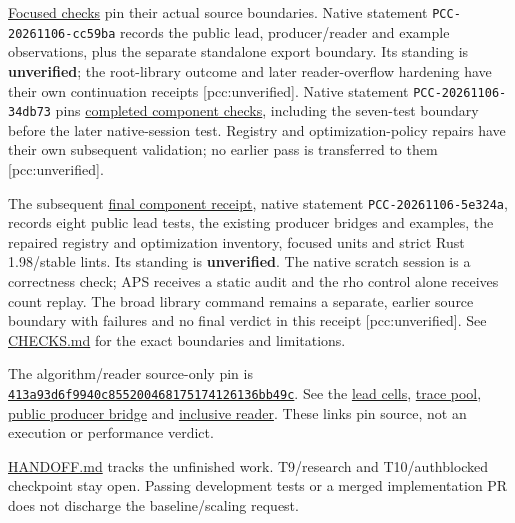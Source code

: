 \documentclass[
  10pt,
]{article}
\begin{document}
\href{validation/focused-checks.json}{Focused checks} pin their actual
source boundaries. Native statement \texttt{PCC-20261106-cc59ba} records
the public lead, producer/reader and example observations, plus the
separate standalone export boundary. Its standing is
\textbf{unverified}; the root-library outcome and later reader-overflow
hardening have their own continuation receipts {[}pcc:unverified{]}.
Native statement \texttt{PCC-20261106-34db73} pins
\href{validation/completed-components.json}{completed component checks},
including the seven-test boundary before the later native-session test.
Registry and optimization-policy repairs have their own subsequent
validation; no earlier pass is transferred to them {[}pcc:unverified{]}.

The subsequent \href{validation/final-components.json}{final component
receipt}, native statement \texttt{PCC-20261106-5e324a}, records eight
public lead tests, the existing producer bridges and examples, the
repaired registry and optimization inventory, focused units and strict
Rust 1.98/stable lints. Its standing is \textbf{unverified}. The native
scratch session is a correctness check; APS receives a static audit and
the rho control alone receives count replay. The broad library command
remains a separate, earlier source boundary with failures and no final
verdict in this receipt {[}pcc:unverified{]}. See \url{CHECKS.md} for
the exact boundaries and limitations.

The algorithm/reader source-only pin is
\href{https://github.com/isogeny-labs/crypto/commit/413a93d6f9940c855200468175174126136bb49c}{\texttt{413a93d6f9940c855200468175174126136bb49c}}.
See the
\href{https://github.com/isogeny-labs/crypto/blob/413a93d6f9940c855200468175174126136bb49c/src/cryptanalysis/aps_single_relation/leads.rs}{lead
cells},
\href{https://github.com/isogeny-labs/crypto/blob/413a93d6f9940c855200468175174126136bb49c/src/cryptanalysis/f4_fp/reuse.rs}{trace
pool},
\href{https://github.com/isogeny-labs/crypto/blob/413a93d6f9940c855200468175174126136bb49c/tests/aps_cost_leads.rs}{public
producer bridge} and
\href{https://github.com/isogeny-labs/crypto/blob/413a93d6f9940c855200468175174126136bb49c/tools/aps-export/src/inclusive.rs}{inclusive
reader}. These links pin source, not an execution or performance
verdict.

\url{HANDOFF.md} tracks the unfinished work. T9/research and
T10/authblocked checkpoint stay open. Passing development tests or a
merged implementation PR does not discharge the baseline/scaling
request.
\end{document}
